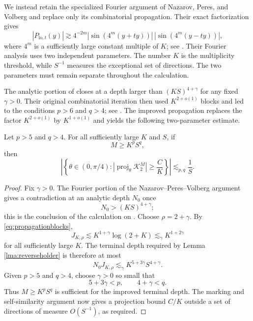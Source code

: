 \documentclass[12pt]{amsart}
\numberwithin{equation}{section}
\DeclareMathOperator{\proj}{proj}
\begin{document}
We instead retain the specialized Fourier argument of Nazarov, Peres, and
Volberg and replace only its combinatorial propagation.  Their exact
factorization gives
\begin{equation}\label{eq:NPV-low-product-bound}
 |P_{\mathrm{lo},t}(y)|
 \gtrsim
 4^{-2m}
 |\sin(4^m(y+ty))|\,
 |\sin(4^m(y-ty))|,
\end{equation}
where $4^m$ is a sufficiently large constant multiple of $K$; see
\cite[pp. 8--11]{NPV}.  Their Fourier analysis uses two independent
parameters.  The number $K$ is the multiplicity threshold, while $S^{-1}$
measures the exceptional set of directions.  The two parameters must remain
separate throughout the calculation.

The analytic portion of \cite{NPV} closes at a depth larger than
$(KS)^{4+\gamma}$ for any fixed $\gamma>0$.  Their original combinatorial
iteration then used $K^{2+o(1)}$ blocks and led to the conditions $p>6$ and
$q>4$; see \cite[pp. 13--15]{NPV}.  The improved propagation replaces the
factor $K^{2+o(1)}$ by $K^{1+o(1)}$ and yields the following two-parameter
estimate.

\begin{proposition}\label{prop:fourcornertwoparameter}
Let $p>5$ and $q>4$.  For all sufficiently large $K$ and $S$, if
\[
 M\geq K^pS^q,
\]
then
\[
 \left|\left\{\theta\in(0,\pi/4):
 |\proj_\theta\mathcal K_2^M|\geq\frac{C}{K}\right\}\right|
 \lesssim_{p,q}\frac1S.
\]
\end{proposition}

\begin{proof}
Fix $\gamma>0$.  The Fourier portion of the Nazarov--Peres--Volberg
argument gives a contradiction at an analytic depth $N_0$ once
\[
 N_0>(KS)^{4+\gamma};
\]
this is the conclusion of the calculation on
\cite[pp. 10--11]{NPV}.  Choose $\rho=2+\gamma$.  By
\eqref{eq:propagationblocks},
\[
 J_{K,\rho}
 \lesssim K^{1+\gamma}\log(2+K)
 \lesssim_\gamma K^{1+2\gamma}
\]
for all sufficiently large $K$.  The terminal depth required by Lemma
\ref{lma:reverseholder} is therefore at most
\[
 N_0J_{K,\rho}
 \lesssim_\gamma
 K^{5+3\gamma}S^{4+\gamma}.
\]
Given $p>5$ and $q>4$, choose $\gamma>0$ so small that
\[
 5+3\gamma<p,
 \qquad
 4+\gamma<q.
\]
Thus $M\geq K^pS^q$ is sufficient for the improved terminal depth.  The
marking and self-similarity argument now gives a projection bound $C/K$
outside a set of directions of measure $O(S^{-1})$, as required.
\end{proof}
\end{document}
